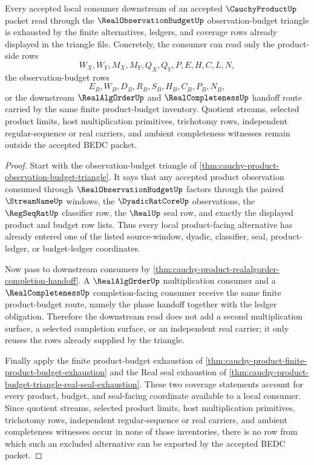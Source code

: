 \begin{lemma}
\label{lem:cauchy-product-observation-budget-downstream-coverage}
Every accepted local consumer downstream of an accepted $\CauchyProductUp$ packet read through the $\RealObservationBudgetUp$ observation-budget triangle is exhausted by the finite alternatives, ledgers, and coverage rows already displayed in the triangle file. Concretely, the consumer can read only the product-side rows
$$
W_X,W_Y,M_X,M_Y,Q_X,Q_Y,P,E,H,C,L,N,
$$
the observation-budget rows
$$
E_B,W_B,D_B,R_B,S_B,H_B,C_B,P_B,N_B,
$$
or the downstream $\RealAlgOrderUp$ and $\RealCompletenessUp$ handoff route carried by the same finite product-budget inventory. Quotient streams, selected product limits, host multiplication primitives, trichotomy rows, independent regular-sequence or real carriers, and ambient completeness witnesses remain outside the accepted BEDC packet.
\end{lemma}
\begin{proof}
Start with the observation-budget triangle of \autoref{thm:cauchy-product-observation-budget-triangle}. It says that any accepted product observation consumed through $\RealObservationBudgetUp$ factors through the paired $\StreamNameUp$ windows, the $\DyadicRatCoreUp$ observations, the $\RegSeqRatUp$ classifier row, the $\RealUp$ seal row, and exactly the displayed product and budget row lists. Thus every local product-facing alternative has already entered one of the listed source-window, dyadic, classifier, seal, product-ledger, or budget-ledger coordinates.

Now pass to downstream consumers by \autoref{thm:cauchy-product-realalgorder-completion-handoff}. A $\RealAlgOrderUp$ multiplication consumer and a $\RealCompletenessUp$ completion-facing consumer receive the same finite product-budget route, namely the phase handoff together with the ledger obligation. Therefore the downstream read does not add a second multiplication surface, a selected completion surface, or an independent real carrier; it only reuses the rows already supplied by the triangle.

Finally apply the finite product-budget exhaustion of \autoref{thm:cauchy-product-finite-product-budget-exhaustion} and the Real seal exhaustion of \autoref{thm:cauchy-product-budget-triangle-real-seal-exhaustion}. These two coverage statements account for every product, budget, and seal-facing coordinate available to a local consumer. Since quotient streams, selected product limits, host multiplication primitives, trichotomy rows, independent regular-sequence or real carriers, and ambient completeness witnesses occur in none of those inventories, there is no row from which such an excluded alternative can be exported by the accepted BEDC packet.
\end{proof}

